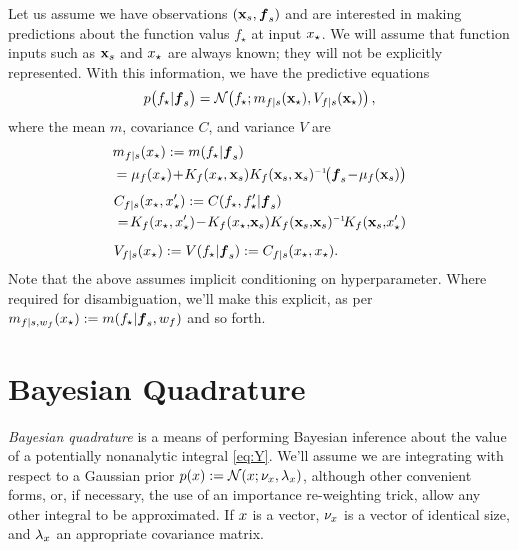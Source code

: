 \documentclass{article}
\renewcommand{\pskinny}[2]{p\big(#1|#2\big)}
\begin{document}
Let us assume we have observations $(\vlfv_s,\vf_s)$ and are interested in making predictions about the function valus $f_\star$ at input $\lfv_\star$. We will assume that function inputs such as $\vlfv_s$ and $\lfv_\star$ are always known; they will not be explicitly represented. With this information, we have the predictive equations
\begin{equation}
 \pskinny{f\st}{\vf_s} = 
\bN{f\st}
{\meancond{f}{\vlfv_\star}{s}}
{\covcond{f}{\vlfv_\star}{s}}\,,
\end{equation}
where the mean $m$, covariance $C$, and variance $V$ are
\begin{align} 
\textstyle
&\meancond{f}{\lfv_\star}{s}
\deq \mean{f_\star}{\vf_s}
\nonumber\\
&= \mu_{f}(\lfv_\star)\!+\!
K_{f}(\lfv_\star,\vlfv_s)
K_{f}(\vlfv_s,\vlfv_s)\inv\!
\bigl(\vf_s\!-\!{\mu}_{f}(\vlfv_s)\bigr)\label{eq:GPMean}
\end{align} 
\begin{align}
&C_{f|s}(\lfv_\star, \lfv'_\star)
\deq C(f_\star,f'_\star|\vf_s) 
\nonumber\\
&=\!K_{f}(\lfv_\star,\lfv'_\star)\! - \!
K_{f}(\lfv_\star,\!\vlfv_s)
K_{f}(\vlfv_s,\!\vlfv_s)\inv\!
K_{f}(\vlfv_s,\!\lfv'_\star)%
\\[0.2cm]
&\covcond{f}{\lfv_\star}{s}
\deq {\cov{f_\star}{\vf_s}} 
\deq C_{f|s}(\lfv_\star, \lfv_\star).
\end{align} 
Note that the above assumes implicit conditioning on hyperparameter. Where required for disambiguation, we'll make this explicit, as per $m_{f|s,w_f}(x\st) \deq \mean{f\st}{\vf_s, w_f}$ and so forth.

\section{Bayesian Quadrature} \label{sec:bq}


\emph{Bayesian quadrature} \citep{BZHermiteQuadrature,BZMonteCarlo} is a means of performing Bayesian inference about the value of a potentially nonanalytic integral \eqref{eq:Y}.
We'll assume we are integrating with respect to a Gaussian prior
$\po{\lfv} \deq \N{\lfv}{\nu_{\lfv}}{\lambda_{\lfv}}$,
although other convenient forms, or, if necessary, the use of an importance re-weighting trick, allow any other integral to be approximated. If $\lfv$ is a vector, $\nu_{\lfv}$ is a  vector of identical size, and $\lambda_{\lfv}$ an appropriate covariance matrix.
\end{document}
